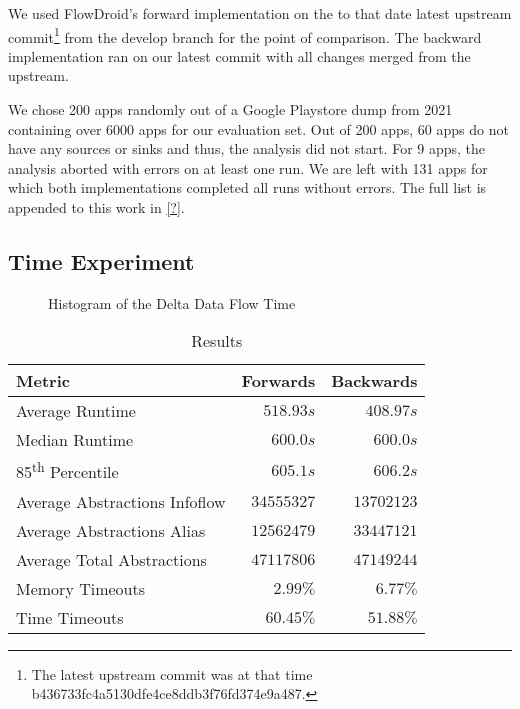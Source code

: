 \documentclass[../draft.tex]{subfiles}
\begin{document}
    We used FlowDroid's forward implementation on the to that date latest upstream commit\footnote{The latest upstream commit was at that time b436733fc4a5130dfe4ce8ddb3f76fd374e9a487.} from the develop branch for the point of comparison.
    The backward implementation ran on our latest commit with all changes merged from the upstream.

    We chose 200 apps randomly out of a Google Playstore dump from 2021 containing over 6000 apps for our evaluation set.
    Out of 200 apps, 60 apps do not have any sources or sinks and thus, the analysis did not start.
    For 9 apps, the analysis aborted with errors on at least one run. 
    We are left with 131 apps for which both implementations completed all runs without errors.
    The full list is appended to this work in \autoref{?}.

    \FloatBarrier
    \subsection{Time Experiment}
    
    \begin{figure}
        \centering
        \resizebox{0.75\columnwidth}{!}{
            
        }
        \caption{Histogram of the Delta Data Flow Time}
    \end{figure}

    \begin{table}[ht]
        \centering
        \begin{tabular}{l | r | r}
            \textbf{Metric} & \textbf{Forwards} & \textbf{Backwards}\\
            \hline\hline
            Average Runtime & $518.93s$ & $408.97s$\\
            Median Runtime & $600.0s$ & $600.0s$\\
            85\textsuperscript{th} Percentile & $605.1s$ & $606.2s$\\
            \hline
            Average Abstractions Infoflow & $34555327$ & $13702123$\\
            Average Abstractions Alias & $12562479$ & $33447121$\\
            Average Total Abstractions & $47117806$ & $47149244$\\
            \hline
            Memory Timeouts & $2.99\%$ & $6.77\%$\\
            Time Timeouts & $60.45\%$ & $51.88\%$\\            
        \end{tabular}
        \caption{Results}
        \label{t:realworldresults}
    \end{table}
\end{document}
